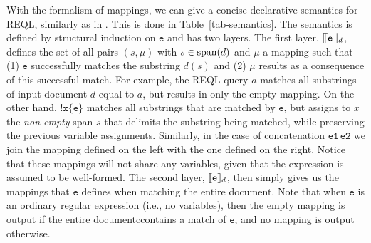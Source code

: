 With the formalism of mappings, we can give a concise declarative semantics for
REQL, similarly as in \citet{MaturanaRV17}. This is done in
Table~\ref{tab-semantics}. The semantics is defined by structural induction on
$\texttt{e}$ and has two layers. The first layer, $\llceil{\texttt{e}}\rrfloor_{d}$, defines
the set of all pairs $(s,\mu)$ with $s \in \text{span}(d)$ and $\mu$ a mapping such
that (1) $\texttt{e}$ successfully matches the substring $d(s)$ and (2) $\mu$
results as a consequence of this successful match. For example, the REQL query
$a$ matches all substrings of input document $d$ equal to $a$, but results in
only the empty mapping. On the other hand, $\texttt{!x\{e\}}$ matches all
substrings that are matched by $\texttt{e}$, but assigns to $x$ the
\emph{non-empty} span $s$ that delimits the substring being matched, while
preserving the previous variable assignments. Similarly, in the case of
concatenation $\texttt{e1}\,\texttt{e2}$ we join the mapping defined on the left
with the one defined on the right. Notice that these mappings will not share any
variables, given that the expression is assumed to be well-formed. The second
layer, $\llbracket\texttt{e}\rrbracket_{d}$, then simply gives us the mappings that $\texttt{e}$
defines when matching the entire document. Note that when $\texttt{e}$ is an
ordinary regular expression (i.e., no variables), then the empty mapping is
output if the entire documentccontains a match of $\texttt{e}$, and no mapping
is output otherwise. 

